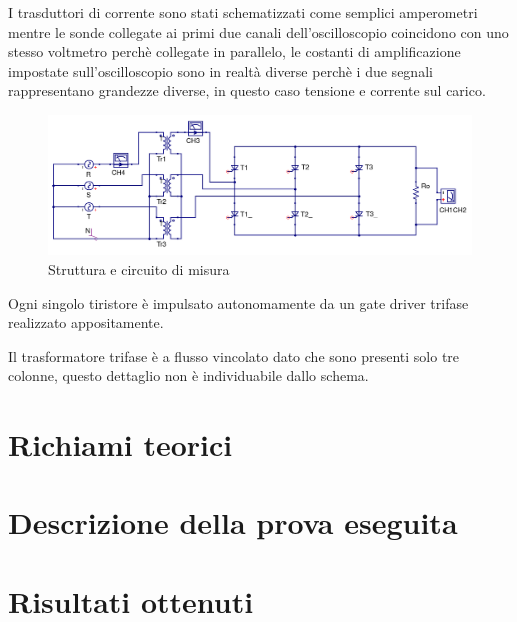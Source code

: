 \documentclass[a4paper,10pt]{article}
\begin{document}
I trasduttori di corrente sono stati schematizzati come semplici
amperometri mentre le sonde collegate ai primi due canali dell'oscilloscopio
coincidono con uno stesso voltmetro perchè collegate in parallelo, le costanti di
amplificazione impostate sull'oscilloscopio sono in realtà diverse perchè i due 
segnali rappresentano grandezze diverse, in questo caso tensione
e corrente sul carico.

\begin{figure}[H]
 \centering
 \includegraphics[keepaspectratio=true,width=1\linewidth]{img/circuito_qucs.png}
 \caption{Struttura e circuito di misura}
 \label{fig:circuito}
\end{figure}

Ogni singolo tiristore è impulsato autonomamente da un gate driver trifase 
realizzato appositamente.

Il trasformatore trifase è a flusso vincolato dato che sono presenti 
solo tre colonne, questo dettaglio non è individuabile dallo schema.
\section{Richiami teorici}

\section{Descrizione della prova eseguita}

\section{Risultati ottenuti}
\end{document}
